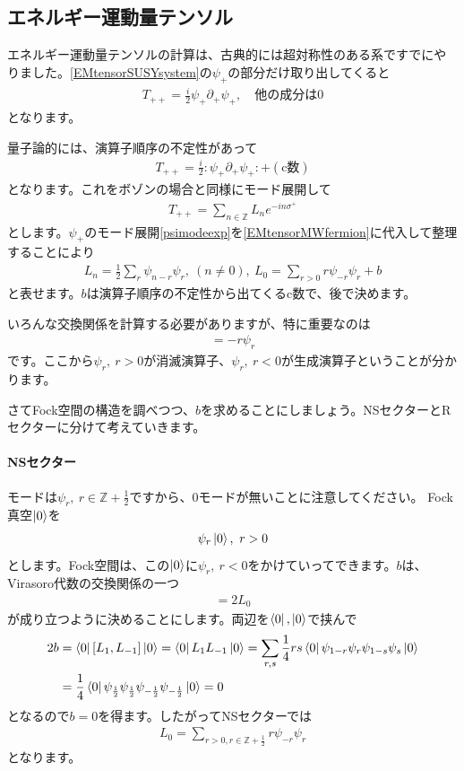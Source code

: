 \documentclass[report,paper=a4, fontsize=12pt, line_length=16cm, number_of_lines=33,dvipdfmx]{jlreq}
\numberwithin{equation}{chapter}
\numberwithin{equation}{section}
\newcommand{\Zb}{\mathbb{Z}}
\newcommand{\del}{\partial}
\begin{document}
\subsection{エネルギー運動量テンソル}
エネルギー運動量テンソルの計算は、古典的には超対称性のある系ですでにやりました。\eqref{EMtensorSUSYsystem}の$\psi_{+}$の部分だけ取り出してくると
\begin{align}
  T_{++}=\frac{i}{2} \psi_{+}\del_{+}\psi_{+},\quad \text{他の成分は0}
\end{align}
となります。

量子論的には、演算子順序の不定性があって
\begin{align}
  T_{++}=\frac{i}{2}:\psi_{+}\del_{+}\psi_{+}:+(\text{c数})\label{EMtensorMWfermion}
\end{align}
となります。これをボゾンの場合と同様にモード展開して
\begin{align}
  T_{++}=\sum_{n\in\Zb}L_{n}e^{-in\sigma^{+}}
\end{align}
とします。$\psi_{+}$のモード展開\eqref{psimodeexp}を\eqref{EMtensorMWfermion}に代入して整理することにより
\begin{align}
  L_{n}=\frac{1}{2}\sum_{r}\psi_{n-r}\psi_{r},\ (n\ne 0),\ 
  L_0=\sum_{r>0}r\psi_{-r}\psi_{r}+b
\end{align}
と表せます。$b$は演算子順序の不定性から出てくるc数で、後で決めます。

いろんな交換関係を計算する必要がありますが、特に重要なのは
\begin{align}
  [L_0,\psi_r]=-r\psi_{r}
\end{align}
です。ここから$\psi_{r},\ r>0$が消滅演算子、$\psi_{r},\ r<0$が生成演算子ということが分かります。

さてFock空間の構造を調べつつ、$b$を求めることにしましょう。NSセクターとRセクターに分けて考えていきます。

\paragraph{NSセクター}
モードは$\psi_{r},\ r\in \Zb+\frac12$ですから、0モードが無いことに注意してください。
Fock真空$\ket{0}$を
\begin{align}
  \psi_{r}\ket{0},\ r>0
\end{align}
とします。Fock空間は、この$\ket{0}$に$\psi_{r},\ r<0$をかけていってできます。$b$は、Virasoro代数の交換関係の一つ
\begin{align}
  [L_{1},L_{-1}]=2L_{0}
\end{align}
が成り立つように決めることにします。両辺を$\bra{0},\ket{0}$で挟んで
\begin{align}
  2b
  &=\bra{0}[L_{1},L_{-1}]\ket{0}
  =\bra{0}L_{1}L_{-1}\ket{0}
  =\sum_{r,s}\frac14rs\bra{0}\psi_{1-r}\psi_{r}\psi_{1-s}\psi_{s}\ket{0}\nonumber\\
  &=\frac14 \bra{0}\psi_{\frac12}\psi_{\frac12}\psi_{-\frac12}\psi_{-\frac12}\ket{0}=0
\end{align}
となるので$b=0$を得ます。したがってNSセクターでは
\begin{align}
  L_0=\sum_{r>0,r\in \Zb+\frac12} r\psi_{-r}\psi_{r}
\end{align}
となります。
\end{document}
